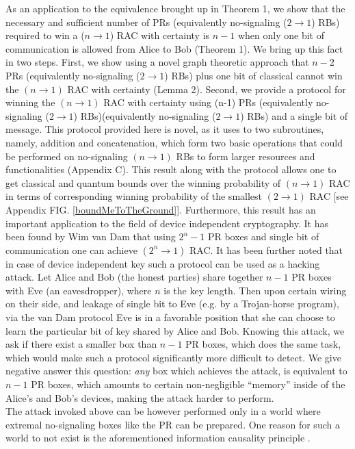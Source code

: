\documentclass[%
 reprint,
 amsmath,amssymb,
 aps,
]{revtex4-1}
\begin{document}
As an application to the equivalence brought up in Theorem 1, we show that the necessary and sufficient number of PRs (equivalently no-signaling ($2 \rightarrow 1$) RBs) required to win a ($n \rightarrow 1$) RAC with certainty is $n-1$ when only one bit of communication is allowed from Alice to Bob (Theorem 1). We bring up this fact in two steps. First, we show using a novel graph theoretic approach that $n-2$ PRs (equivalently no-signaling ($2 \rightarrow 1$) RBs) plus one bit of classical cannot win the $(n\rightarrow 1)$ RAC with certainty (Lemma 2). Second, we provide a protocol for winning the $(n\rightarrow 1)$ RAC with certainty using (n-1) PRs (equivalently no-signaling ($2 \rightarrow 1$) RBs)(equivalently no-signaling ($2 \rightarrow 1$) RBs) and a single bit of message. This protocol provided here is novel, as it uses to two subroutines, namely, addition and concatenation, which form two basic operations that could be performed on no-signaling $(n\rightarrow 1)$ RBs to form larger resources and functionalities (Appendix C). This result along with the protocol allows one to get classical and quantum bounds over the winning probability of $(n\rightarrow 1)$ RAC in terms of corresponding winning probability of the smallest $(2\rightarrow 1)$ RAC [see Appendix FIG. \ref{boundMeToTheGround}]. Furthermore, this result has an important application to the field of device independent cryptography. It has been found by Wim van Dam \cite{WvD05} that using $2^n-1$ PR boxes and single bit of communication one can achieve $(2^n \rightarrow 1)$ RAC. It has been further noted \cite{Colbeck} that
in case of device independent key such a protocol can be used as a hacking attack. Let Alice and Bob (the honest parties) share together $n-1$ PR boxes with Eve (an eavesdropper), where $n$ is the key length. Then upon certain wiring on their side, and leakage of single bit to Eve (e.g. by a Trojan-horse program), via the van Dam protocol Eve is in a favorable position that she can choose to learn the particular bit of key shared by Alice and Bob. Knowing this attack, we ask if there exist a smaller box than $n-1$ PR boxes, which does the same task, which would make such a protocol significantly more difficult to detect. We give negative answer this question:
{\it any} box which achieves the attack, is equivalent to $n-1$ PR boxes, which amounts to certain non-negligible "`memory"' inside of the Alice's and Bob's devices,
making the attack harder to perform.  \\
The attack invoked above can be however performed only in a world where extremal no-signaling boxes like the PR can be prepared. One reason for such a world to not exist is the aforementioned information causality principle \cite{pawlowski-2009-461}.
\end{document}
